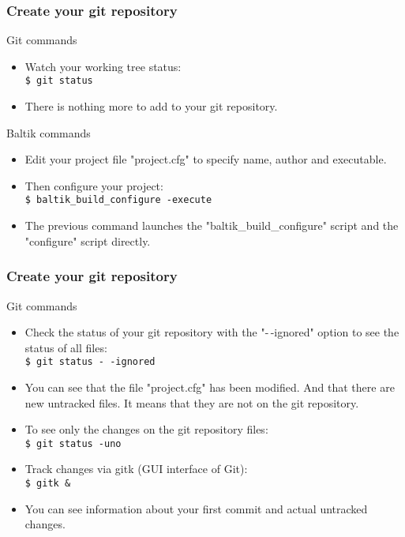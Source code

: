 \documentclass[10pt, hyperref={unicode=true,pdfusetitle, bookmarks=true,bookmarksnumbered=false,bookmarksopen=false, breaklinks=false,pdfborder={0 0 1},backref=true,colorlinks=true,linkcolor=darkblue,pageanchor, urlcolor=darkblue}]{beamer}
\begin{document}
\begin{frame}
\frametitle{Create your git repository}

\begin{alertblock}{Git commands}
\begin{itemize}
\item Watch your working tree status:\\
\texttt{\$ git status}
\item There is nothing more to add to your git repository.
\end{itemize}
\end{alertblock}

\begin{block}{Baltik commands}
\begin{itemize}
\item Edit your project file "project.cfg" to specify name, author and executable.
\item Then configure your project:\\
\texttt{\$ baltik\_build\_configure -execute}\\
\item The previous command launches the "baltik\_build\_configure" script and the "configure" script directly.
\end{itemize}
\end{block}

\end{frame}
\begin{frame}
\frametitle{Create your git repository}
\begin{alertblock}{Git commands}

\begin{itemize}
\item Check the status of your git repository with the "-\,-ignored" option to see the status of all files:\\
\texttt{\$ git status -\,-ignored}\\

\item You can see that the file "project.cfg" has been modified. And that there are new untracked files.
It means that they are not on the git repository.

\item To see only the changes on the git repository files:\\
\texttt{\$ git status -uno}\\

\item Track changes via gitk (GUI interface of Git):\\
\texttt{\$ gitk \&}

\item You can see information about your first commit and actual untracked changes.
\end{itemize}

\end{alertblock}
\end{frame}
\end{document}
